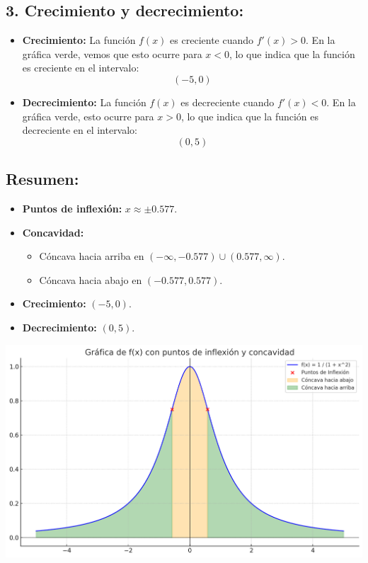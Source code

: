 \documentclass[11pt,letterpaper]{article}
\begin{document}
\subsection*{3. Crecimiento y decrecimiento:}

\begin{itemize}
    \item \textbf{Crecimiento:} La función \( f(x) \) es creciente cuando \( f'(x) > 0 \). En la gráfica verde, vemos que esto ocurre para \( x < 0 \), lo que indica que la función es creciente en el intervalo:
    \[
    (-5, 0)
    \]
    
    \item \textbf{Decrecimiento:} La función \( f(x) \) es decreciente cuando \( f'(x) < 0 \). En la gráfica verde, esto ocurre para \( x > 0 \), lo que indica que la función es decreciente en el intervalo:
    \[
    (0, 5)
    \]
\end{itemize}

\subsection*{Resumen:}

\begin{itemize}
    \item \textbf{Puntos de inflexión:} \( x \approx \pm 0.577 \).
    \item \textbf{Concavidad:}
    \begin{itemize}
        \item Cóncava hacia arriba en \( (-\infty, -0.577) \cup (0.577, \infty) \).
        \item Cóncava hacia abajo en \( (-0.577, 0.577) \).
    \end{itemize}
    \item \textbf{Crecimiento:} \( (-5, 0) \).
    \item \textbf{Decrecimiento:} \( (0, 5) \).
\end{itemize}

\begin{center}
    \includegraphics[width=17cm]{./imagenes/grafica.png}
\end{center}
\end{document}
